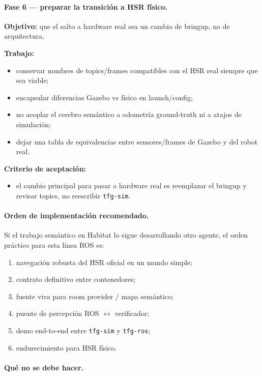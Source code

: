 \documentclass[11pt,a4paper]{article}
\begin{document}
\paragraph{Fase 6 --- preparar la transición a HSR físico.}

\textbf{Objetivo:} que el salto a hardware real sea un cambio de bringup, no de
arquitectura.

\textbf{Trabajo:}
\begin{itemize}
  \item conservar nombres de topics/frames compatibles con el HSR real siempre
        que sea viable;
  \item encapsular diferencias Gazebo vs físico en launch/config;
  \item no acoplar el cerebro semántico a odometría ground-truth ni a atajos de
        simulación;
  \item dejar una tabla de equivalencias entre sensores/frames de Gazebo y del
        robot real.
\end{itemize}

\textbf{Criterio de aceptación:}
\begin{itemize}
  \item el cambio principal para pasar a hardware real es reemplazar el bringup
        y revisar topics, no reescribir \texttt{tfg-sim}.
\end{itemize}

\paragraph{Orden de implementación recomendado.}

Si el trabajo semántico en Habitat lo sigue desarrollando otro agente, el orden
práctico para esta línea ROS es:

\begin{enumerate}
  \item navegación robusta del HSR oficial en un mundo simple;
  \item contrato definitivo entre contenedores;
  \item fuente viva para room provider / mapa semántico;
  \item puente de percepción ROS $\leftrightarrow$ verificador;
  \item demo end-to-end entre \texttt{tfg-sim} y \texttt{tfg-ros};
  \item endurecimiento para HSR físico.
\end{enumerate}

\paragraph{Qué no se debe hacer.}
\end{document}
